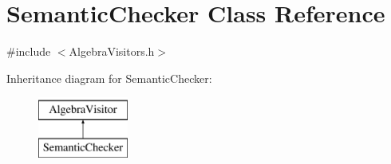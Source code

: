 \hypertarget{class_semantic_checker}{\section{Semantic\+Checker Class Reference}
\label{class_semantic_checker}
}


{\ttfamily \#include $<$Algebra\+Visitors.\+h$>$}

Inheritance diagram for Semantic\+Checker\+:\begin{figure}[H]
\begin{center}
\leavevmode
\includegraphics[height=2.000000cm]{class_semantic_checker}
\end{center}
\end{figure}
